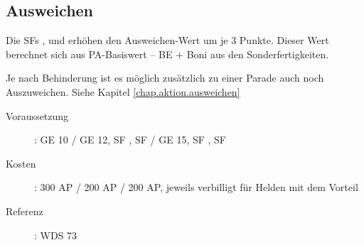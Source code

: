 \subsection{Ausweichen}
\label{sf.ausweichen}
Die SFs ,  und  erhöhen den Ausweichen-Wert um je 3 Punkte.
Dieser Wert berechnet sich aus PA-Basiswert – BE + Boni aus den Sonderfertigkeiten.

Je nach Behinderung ist es möglich zusätzlich zu einer Parade auch noch Auszuweichen.
Siehe Kapitel \ref{chap.aktion.ausweichen}

\begin{description}
    \item[Voraussetzung]:
        GE 10 / GE 12, SF , SF  / GE 15, SF , SF 
    \item [Kosten]:
        300 AP / 200 AP / 200 AP, jeweils verbilligt für Helden mit dem Vorteil 
    \item [Referenz]:
        WDS 73
\end{description}
